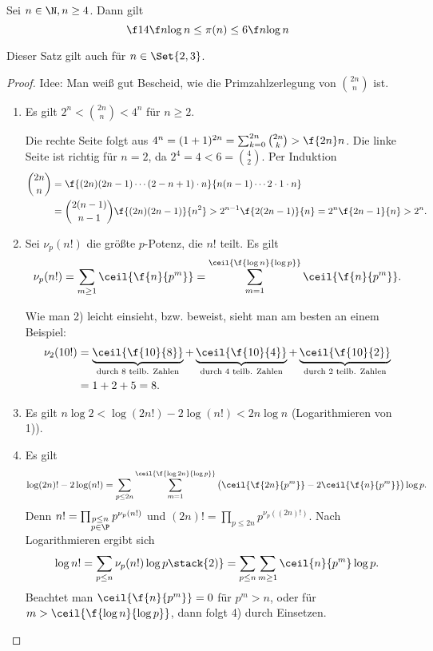 \begin{st}[Tschebyscheff, 1850] \label{7.5}
	Sei $n \in \N, n \ge 4$.
	Dann gilt
	\[
		\f 14 \f n{\log n}
		\le \pi(n) \le
		6 \f n{\log n}
	\]
	\begin{note}
		Dieser Satz gilt auch für $n \in \Set{2, 3}$.
	\end{note}
	\begin{proof}
		Idee: Man weiß gut Bescheid, wie die Primzahlzerlegung von $\binom{2n}{n}$ ist.
		\begin{enumerate}[1)]
			\item
				Es gilt $2^n < \binom{2n}{n} < 4^n$ für $n \ge 2$.

				Die rechte Seite folgt aus $4^n = (1+1)^{2n} = \sum_{k=0}^{2n} \binom{2n}{k} > \f{2n}n$.
				Die linke Seite ist richtig für $n = 2$, da $2^4 = 4 < 6 = \binom{4}{2}$.
				Per Induktion
				\begin{align*}
					\binom{2n}{n}
					&= \f {(2n)(2n-1)\dotsb (2-n+1)\cdot n}{n(n-1)\dotsb 2\cdot 1 \cdot n} \\
					&= \binom{2(n-1)}{n-1} \f {(2n)(2n-1)}{n^2}
					> 2^{n-1} \f {2(2n-1)}{n}
					= 2^n \f {2n - 1}{n}
					> 2^n.
				\end{align*}
			\item
				Sei $\nu_p(n!)$ die größte $p$-Potenz, die $n!$ teilt.
				Es gilt
				\[
					\nu_p(n!) = \sum_{m \ge 1} \ceil{\f{n}{p^m}} 
					= \sum_{m=1}^{\ceil{\f{\log n}{\log p}}} \ceil{\f {n}{p^m}}.
				\]

				Wie man 2) leicht einsieht, bzw. beweist, sieht man am besten an einem Beispiel:
				\begin{align*}
					\nu_2(10!)
					&= \underbrace{\ceil{\f {10}{8}}}_{\text{durch $8$ teilb. Zahlen}} + \underbrace{\ceil{\f {10}{4}}}_{\text{durch $4$ teilb. Zahlen}} + \underbrace{\ceil{\f {10}{2}}}_{\text{durch $2$ teilb. Zahlen}} \\
					&= 1 + 2 + 5
					= 8.
				\end{align*}
			\item
				Es gilt $n \log 2 < \log(2n!) - 2 \log(n!) < 2n \log n$ (Logarithmieren von 1)).
			\item
				Es gilt
				\[
					\log(2n)! - 2 \log(n!) = \sum_{p \le 2n} \sum_{m = 1}^{\ceil{\f{\log 2n}{\log p}}} \big( \ceil{\f {2n}{p^m}} -  2 \ceil{\f{n}{p^m}} \big) \log p.
				\]
				Denn $n! = \prod_{\substack{p \le n \\ p \in \P}} p^{\nu_p(n!)}$ und $(2n)! = \prod_{p \le 2n} p^{\nu_p((2n)!)}$.
				Nach Logarithmieren ergibt sich
				\[
					\log n! = \sum_{p \le n} \nu_p(n!) \log p
					\stack{2)}= \sum_{p \le n} \sum_{m \ge 1} \ceil{n}{p^m} \log p.
				\]
				Beachtet man $\ceil{\f{n}{p^m}} = 0$ für $p^m > n$, oder für $m > \ceil{\f {\log n}{\log p}}$, dann folgt 4) durch Einsetzen.


\end{enumerate}
\end{proof}
\end{st}
